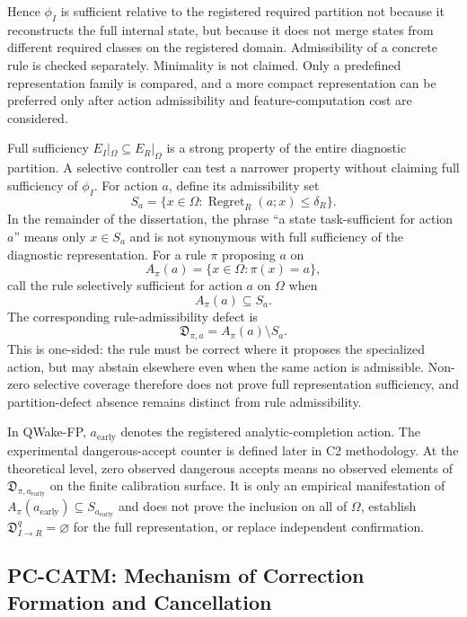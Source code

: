 Hence $\phi_I$ is sufficient relative to the registered required partition not because
it reconstructs the full internal state, but because it does not merge states from
different required classes on the registered domain. Admissibility of a concrete rule
is checked separately. Minimality is not claimed. Only a predefined representation
family is compared, and a more compact representation can be preferred only after
action admissibility and feature-computation cost are considered.

Full sufficiency $E_I|_\Omega\subseteq E_R|_\Omega$ is a strong property of the entire
diagnostic partition. A selective controller can test a narrower property without
claiming full sufficiency of $\phi_I$. For action $a$, define its admissibility set
\[
  S_a=\{x\in\Omega:\operatorname{Regret}_R(a;x)\leq\delta_R\}.
\]
In the remainder of the dissertation, the phrase ``a state task-sufficient for action
$a$'' means only $x\in S_a$ and is not synonymous with full sufficiency of the
diagnostic representation. For a rule $\pi$ proposing $a$ on
\[
  A_{\pi}(a)=\{x\in\Omega:\pi(x)=a\},
\]
call the rule selectively sufficient for action $a$ on $\Omega$ when
\[
  A_{\pi}(a)\subseteq S_a.
\]
The corresponding rule-admissibility defect is
\[
  \mathfrak D_{\pi,a}=A_{\pi}(a)\setminus S_a.
\]
This is one-sided: the rule must be correct where it proposes the specialized action,
but may abstain elsewhere even when the same action is admissible. Non-zero selective
coverage therefore does not prove full representation sufficiency, and partition-defect
absence remains distinct from rule admissibility.

In QWake-FP, $a_{\mathrm{early}}$ denotes the registered analytic-completion action.
The experimental dangerous-accept counter is defined later in C2 methodology. At the
theoretical level, zero observed dangerous accepts means no observed elements of
$\mathfrak D_{\pi,a_{\mathrm{early}}}$ on the finite calibration surface. It is only
an empirical manifestation of
$A_{\pi}(a_{\mathrm{early}})\subseteq S_{a_{\mathrm{early}}}$ and does not prove the
inclusion on all of $\Omega$, establish
$\mathfrak D_{I\to R}^{q}=\varnothing$ for the full representation, or replace
independent confirmation.

\subsection{PC-CATM: Mechanism of Correction Formation and Cancellation}
\label{sec:theory-pc-catm}

